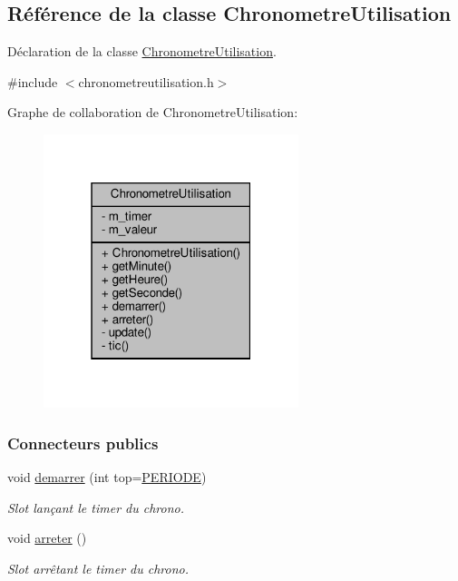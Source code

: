 \hypertarget{class_chronometre_utilisation}{}\subsection{Référence de la classe Chronometre\+Utilisation}
\label{class_chronometre_utilisation}


Déclaration de la classe \hyperlink{class_chronometre_utilisation}{Chronometre\+Utilisation}.  




{\ttfamily \#include $<$chronometreutilisation.\+h$>$}



Graphe de collaboration de Chronometre\+Utilisation\+:\nopagebreak
\begin{figure}[H]
\begin{center}
\leavevmode
\includegraphics[width=211pt]{class_chronometre_utilisation__coll__graph}
\end{center}
\end{figure}
\subsubsection*{Connecteurs publics}
\begin{DoxyCompactItemize}
\item 
void \hyperlink{class_chronometre_utilisation_ac3f2fb837e9ba408d4dcaf488b289c64}{demarrer} (int top=\hyperlink{chronometreutilisation_8h_ad0750d12e2f5f404ec458d4066a53fa4}{P\+E\+R\+I\+O\+DE})
\begin{DoxyCompactList}\small\item\em Slot lançant le timer du chrono. \end{DoxyCompactList}\item 
void \hyperlink{class_chronometre_utilisation_a938c4c86a6b33eaf60af7be81ee7ec32}{arreter} ()
\begin{DoxyCompactList}\small\item\em Slot arrêtant le timer du chrono. \end{DoxyCompactList}\end{DoxyCompactItemize}
